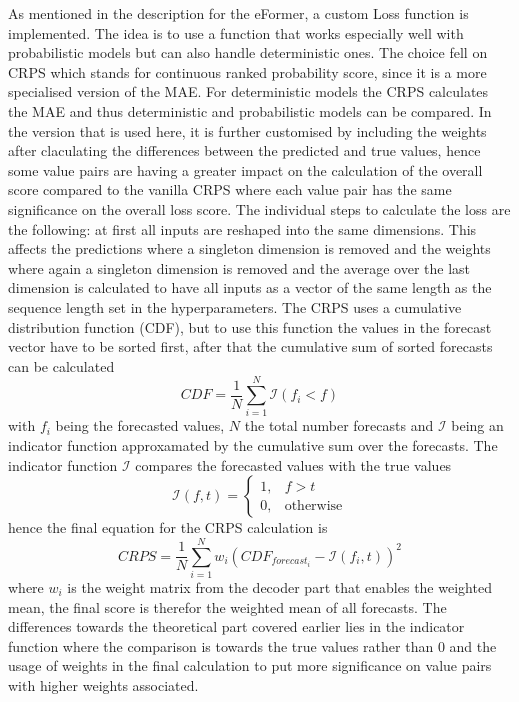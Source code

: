 \documentclass{article}
\begin{document}
As mentioned in the description for the eFormer, a custom Loss function is implemented. The idea is to use a function that works especially well with probabilistic models but can also handle deterministic ones. The choice fell on CRPS which stands for continuous ranked probability score, since it is a more specialised version of the MAE. For deterministic models the CRPS calculates the MAE and thus deterministic and probabilistic models can be compared. In the version that is used here, it is further customised by including the weights after claculating the differences between the predicted and true values, hence some value pairs are having a greater impact on the calculation of the overall score compared to the vanilla CRPS where each value pair has the same significance on the overall loss score. The individual steps to calculate the loss are the following: at first all inputs are reshaped into the same dimensions. This affects the predictions where a singleton dimension is removed and the weights where again a singleton dimension is removed and the average over the last dimension is calculated to have all inputs as a vector of the same length as the sequence length set in the hyperparameters. The CRPS uses a cumulative distribution function (CDF), but to use this function the values in the forecast vector have to be sorted first, after that the cumulative sum of sorted forecasts can be calculated
\begin{equation}
    CDF = \frac{1}{N} \sum^N_{i = 1} \mathcal{I}(f_i < f)
\end{equation}
with $f_i$ being the forecasted values, $N$ the total number forecasts and $\mathcal{I}$ being an indicator function approxamated by the cumulative sum over the forecasts. The indicator function $\mathcal{I}$ compares the forecasted values with the true values
\begin{equation}
    \mathcal{I} (f,t) = \begin{cases}
        1, & f > t \\
        0, & \text{otherwise}
    \end{cases}
\end{equation}
hence the final equation for the CRPS calculation is
\begin{equation}
    CRPS = \frac{1}{N} \sum^N_{i = 1} w_i (CDF_{forecast_i} - \mathcal{I}(f_i,t))^2
\end{equation}
where $w_i$ is the weight matrix from the decoder part that enables the weighted mean, the final score is therefor the weighted mean of all forecasts. The differences towards the theoretical part covered earlier lies in the indicator function where the comparison is towards the true values rather than $0$ and the usage of weights in the final calculation to put more significance on value pairs with higher weights associated.
\end{document}
